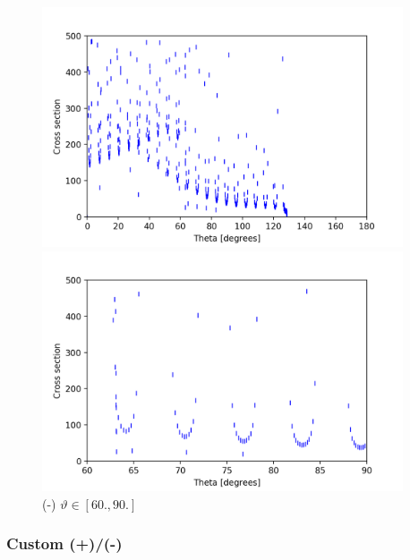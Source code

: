 \documentclass[a4paper,12pt]{article}
\begin{document}
\begin{figure}[H]
	\centering
	\begin{minipage}{0.5\textwidth}
		\centering
		\includegraphics[width=0.95\textwidth]{./cross-pot-og1signed.png}
		\caption{ (-) $\vartheta \in [0., 180.]$ }
	\end{minipage}\hfill
	\begin{minipage}{0.5\textwidth}
		\centering
		\includegraphics[width=0.95\textwidth]{./cross-pot-og2signed.png}
		\caption{ (-) $\vartheta \in [60., 90.]$ }
	\end{minipage}
\end{figure}

\subsubsection{Custom (+)/(-)}
\end{document}
